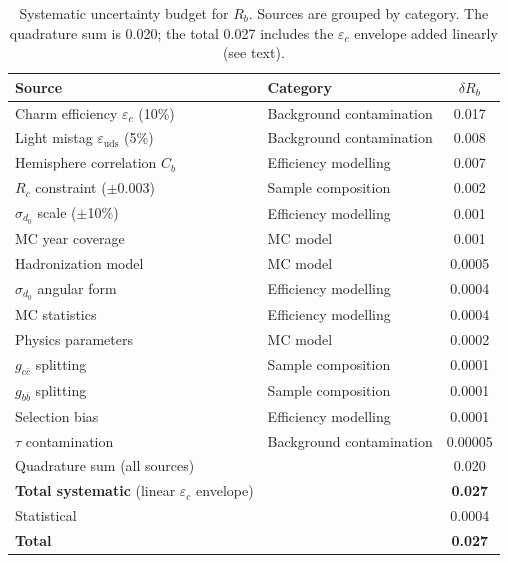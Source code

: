 \documentclass[11pt,a4paper]{article}
\begin{document}
\begin{table}[htbp]
\centering
\caption{Systematic uncertainty budget for $R_b$.  Sources are grouped
  by category.  The quadrature sum is 0.020; the total 0.027 includes
  the $\varepsilon_c$ envelope added linearly (see text).}
\label{tbl:syst-rb}
\begin{tabular}{llc}
\toprule
Source & Category & $\delta R_b$ \\
\midrule
Charm efficiency $\varepsilon_c$ (10\%) & Background contamination & 0.017 \\
Light mistag $\varepsilon_\mathrm{uds}$ (5\%) & Background contamination & 0.008 \\
Hemisphere correlation $C_b$ & Efficiency modelling & 0.007 \\
$R_c$ constraint ($\pm 0.003$) & Sample composition & 0.002 \\
$\sigma_{d_0}$ scale ($\pm$10\%) & Efficiency modelling & 0.001 \\
MC year coverage & MC model & 0.001 \\
Hadronization model & MC model & 0.0005 \\
$\sigma_{d_0}$ angular form & Efficiency modelling & 0.0004 \\
MC statistics & Efficiency modelling & 0.0004 \\
Physics parameters & MC model & 0.0002 \\
$g_{c\bar{c}}$ splitting & Sample composition & 0.0001 \\
$g_{b\bar{b}}$ splitting & Sample composition & 0.0001 \\
Selection bias & Efficiency modelling & 0.0001 \\
$\tau$ contamination & Background contamination & 0.00005 \\
\midrule
Quadrature sum (all sources) & & 0.020 \\
\textbf{Total systematic} (linear $\varepsilon_c$ envelope) & & \textbf{0.027} \\
Statistical & & 0.0004 \\
\midrule
\textbf{Total} & & \textbf{0.027} \\
\bottomrule
\end{tabular}
\end{table}
\end{document}
